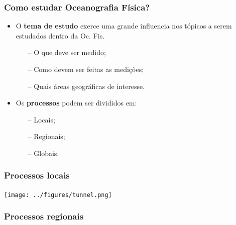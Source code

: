 \begin{frame}
    \frametitle{Como estudar Oceanografia Física?}
    \begin{itemize}[<+-| alert@+>]
        \item O {\bf tema de estudo} exerce uma grande influencia nos tópicos a
              serem estudados dentro da Oc. Fis.
            \begin{enumerate}[<+-| alert@+>]
                \item[--]O que deve ser medido;
                \item[--]Como devem ser feitas as medições;
                \item[--]Quais áreas geográficas de interesse.
            \end{enumerate}
        \item Os {\bf processos} podem ser divididos em:
            \begin{enumerate}[<+-| alert@+>]
                \item[--]Locais;
                \item[--]Regionais;
                \item[--]Globais.
            \end{enumerate}
    \end{itemize}
\end{frame}

\begin{frame}
    \frametitle{Processos locais}
    \begin{center}
      \texttt{[image: ../figures/tunnel.png]}
    \end{center}
\end{frame}

\begin{frame}
    \frametitle{Processos regionais}
    \begin{center}
    \end{center}
\end{frame}

